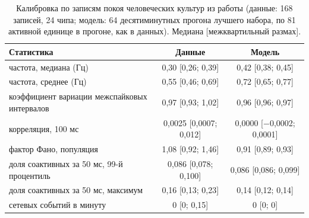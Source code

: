\documentclass[pre,twocolumn,superscriptaddress,showpacs=false,amsmath,amssymb,nofootinbib]{revtex4-2}
\begin{document}
\begin{table}[t]
\caption{Калибровка по записям покоя человеческих культур из работы \cite{Kagan2022} (данные: 168 записей, 24 чипа; модель: 64 десятиминутных прогона лучшего набора, по 81 активной единице в прогоне, как в данных). Медиана [межквартильный размах].}
\label{tab:calib}
\footnotesize
\begin{ruledtabular}
\begin{tabular}{lcc}
Статистика & Данные & Модель \\
\hline
частота, медиана (Гц) & 0{,}30 [0{,}26; 0{,}39] & 0{,}42 [0{,}38; 0{,}45] \\
частота, среднее (Гц) & 0{,}55 [0{,}46; 0{,}69] & 0{,}72 [0{,}65; 0{,}77] \\
коэффициент вариации межспайковых интервалов & 0{,}97 [0{,}93; 1{,}02] & 0{,}96 [0{,}96; 0{,}97] \\
корреляция, 100 мс & 0{,}0025 [0{,}0007; 0{,}012] & 0{,}0000 [$-$0{,}0002; 0{,}0001] \\
фактор Фано, популяция & 1{,}08 [0{,}92; 1{,}46] & 0{,}91 [0{,}89; 0{,}93] \\
доля соактивных за 50 мс, 99-й процентиль & 0{,}086 [0{,}078; 0{,}100] & 0{,}086 [0{,}086; 0{,}099] \\
доля соактивных за 50 мс, максимум & 0{,}16 [0{,}13; 0{,}23] & 0{,}14 [0{,}12; 0{,}14] \\
сетевых событий в минуту & 0 [0; 0{,}15] & 0 [0; 0] \\
\end{tabular}
\end{ruledtabular}
\end{table}
\end{document}
